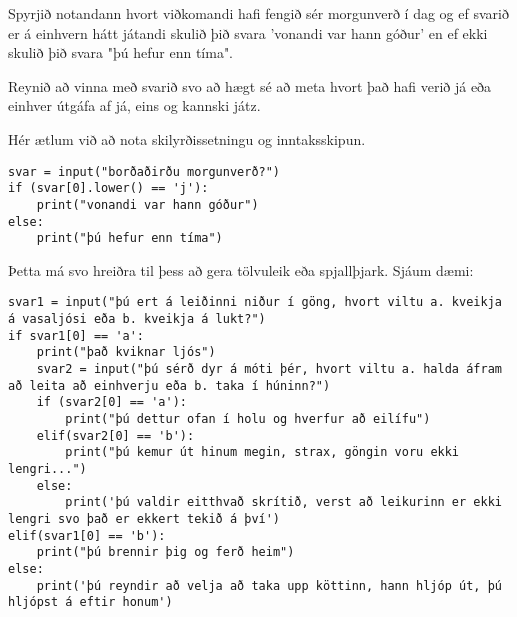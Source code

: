 \begin{exercise}\label{exp5}
Spyrjið notandann hvort viðkomandi hafi fengið sér morgunverð í dag og ef svarið er á einhvern hátt játandi skulið þið svara 'vonandi var hann góður' en ef ekki skulið þið svara "þú hefur enn tíma".

Reynið að vinna með svarið svo að hægt sé að meta hvort það hafi verið já eða einhver útgáfa af já, eins og kannski játz.
\end{exercise}
\begin{Answer}[ref={exp5}]
Hér ætlum við að nota skilyrðissetningu og inntaksskipun.
	\begin{lstlisting}
svar = input("borðaðirðu morgunverð?")
if (svar[0].lower() == 'j'):
	print("vonandi var hann góður")
else:
	print("þú hefur enn tíma")\end{lstlisting}

Þetta má svo hreiðra til þess að gera tölvuleik eða spjallþjark.
Sjáum dæmi:
\begin{lstlisting}
svar1 = input("þú ert á leiðinni niður í göng, hvort viltu a. kveikja á vasaljósi eða b. kveikja á lukt?")
if svar1[0] == 'a':
	print("það kviknar ljós")
	svar2 = input("þú sérð dyr á móti þér, hvort viltu a. halda áfram að leita að einhverju eða b. taka í húninn?")
	if (svar2[0] == 'a'):
		print("þú dettur ofan í holu og hverfur að eilífu")
	elif(svar2[0] == 'b'):
		print("þú kemur út hinum megin, strax, göngin voru ekki lengri...")
	else:
		print('þú valdir eitthvað skrítið, verst að leikurinn er ekki lengri svo það er ekkert tekið á því')
elif(svar1[0] == 'b'):
	print("þú brennir þig og ferð heim")
else:
	print('þú reyndir að velja að taka upp köttinn, hann hljóp út, þú hljópst á eftir honum')\end{lstlisting}
\newpage
\end{Answer}

